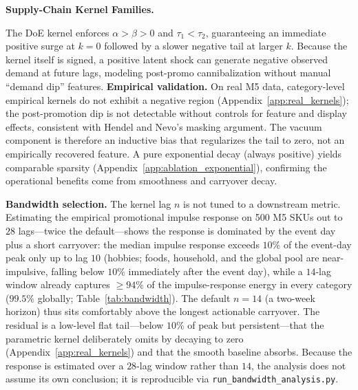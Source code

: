 \documentclass[10pt]{article} %
\theoremstyle{plain}
\theoremstyle{definition}
\begin{document}
\textbf{Supply-Chain Kernel Families.}
\begin{table}[t]
\centering
\footnotesize
\setlength{\tabcolsep}{2pt}
\caption{Supply-Chain Kernel Families}
\label{tab:kernel_families}
\end{table}

The DoE kernel enforces $\alpha > \beta > 0$ and $\tau_1 < \tau_2$, guaranteeing an immediate positive surge at $k=0$ followed by a slower negative tail at larger $k$. Because the kernel itself is signed, a positive latent shock can generate negative observed demand at future lags, modeling post-promo cannibalization without manual ``demand dip'' features. \textbf{Empirical validation.} On real M5 data, category-level empirical kernels do not exhibit a negative region (Appendix~\ref{app:real_kernels}); the post-promotion dip is not detectable without controls for feature and display effects, consistent with Hendel and Nevo's masking argument. The vacuum component is therefore an inductive bias that regularizes the tail to zero, not an empirically recovered feature. A pure exponential decay (always positive) yields comparable sparsity (Appendix~\ref{app:ablation_exponential}), confirming the operational benefits come from smoothness and carryover decay.

\textbf{Bandwidth selection.} The kernel lag $n$ is not tuned to a downstream metric. Estimating the empirical promotional impulse response on 500 M5 SKUs out to $28$ lags---twice the default---shows the response is dominated by the event day plus a short carryover: the median impulse response exceeds $10\%$ of the event-day peak only up to lag $10$ (hobbies; foods, household, and the global pool are near-impulsive, falling below $10\%$ immediately after the event day), while a $14$-lag window already captures $\geq 94\%$ of the impulse-response energy in every category ($99.5\%$ globally; Table~\ref{tab:bandwidth}). The default $n=14$ (a two-week horizon) thus sits comfortably above the longest actionable carryover. The residual is a low-level flat tail---below $10\%$ of peak but persistent---that the parametric kernel deliberately omits by decaying to zero (Appendix~\ref{app:real_kernels}) and that the smooth baseline absorbs. Because the response is estimated over a $28$-lag window rather than $14$, the analysis does not assume its own conclusion; it is reproducible via \texttt{run\_bandwidth\_analysis.py}.
\end{document}
